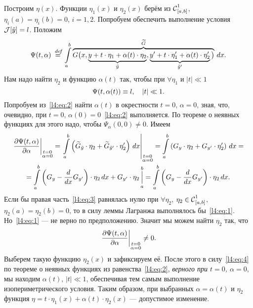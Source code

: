 Построим $\eta(x)$. Функции $\eta_1(x)$ и $\eta_2(x)$ берём из $\Cfn[{[a,b]}]{1}$, $\eta_i(a)=\eta_i(b)=0$, $i=1,2$. Попробуем обеспечить выполнение условия $\J[\tilde{y}]=l$. Положим
\begin{equation*}
	\hfill\Psi(t,\alpha)\eqdef\int\limits_a^b \overbrace{G\big(x,\underbrace{y+t\cdot\eta_1+\alpha(t)\cdot\eta_2}_{\tilde{y}},\underbrace{y'+t\cdot\eta'_1+\alpha(t)\cdot\eta'_2}_{\tilde{y}'}\big)}^{\widetilde{G}}\,dx.\hfill
\end{equation*}
Нам надо найти $\eta_2$ и функцию $\alpha(t)$ так, чтобы при $\forall\eta_1$ и $|t|\ll1$
\begin{equation}
	\label{l4:eq:2}
	\hfill\Psi(t,\alpha(t))\equiv l,\quad|t|\ll1.\hfill
\end{equation}
Попробуем из~\eqref{l4:eq:2} найти $\alpha(t)$ в окрестности $t=0$, $\alpha=0$, зная, что, очевидно, при $t=0$, ${\alpha(0)=0}$~\eqref{l4:eq:2} выполняется. По теореме о неявных функциях для этого надо, чтобы $\Psi_{\alpha}(0,0)\neq0$. Имеем
\begin{multline}
	\label{l4:eq:3}
	\left.\pder{\Psi(t,\alpha)}{\alpha}\right|_{\substack{t=0\\\alpha=0}}=\left.\int\limits_a^b\left(\widetilde{G}_{\tilde{y}}\cdot\eta_2+\widetilde{G}_{\tilde{y}'}\cdot\eta'_2\right)\,dx\right|_{\substack{t=0\\\alpha=0}}=\int\limits_a^b\left({G}_{{y}}\cdot\eta_2+{G}_{y'}\cdot\eta'_2\right)\,dx=\\
	=\int\limits_a^b\left(G_y-\der{}{x}G_{y'}\right)\cdot\eta_2\,dx+G_{y'}\cdot\eta_2\mathop{\Big|}\limits_a^b=\int\limits_a^b\left(G_y-\der{}{x}G_{y'}\right)\cdot\eta_2\,dx.
\end{multline}
Если бы правая часть~\eqref{l4:eq:3} равнялась нулю при $\forall\eta_2$, $\eta_2\in\Cfn[{[a,b]}]{1}$, $\eta_2(a)=\eta_2(b)=0$, то в силу леммы Лагранжа выполнялось бы~\eqref{l4:eq:1}. Но~\eqref{l4:eq:1} --- не верно по предположению. Значит мы можем найти $\eta_2$ так, что
\begin{equation}
	\label{l4:eq:4}
	\hfill\left.\pder{\Psi(t,\alpha)}{\alpha}\right|_{\substack{t=0\\\alpha=0}}\neq0.\hfill
\end{equation}
Выберем такую функцию $\eta_2(x)$ и зафиксируем её. После этого в силу~\eqref{l4:eq:4} по теореме о неявных функциях из равенства~\eqref{l4:eq:2}, \emph{верного при  $t=0$, $\alpha=0$}, мы находим $\alpha(t)$, $|t|\ll1$, обеспечивая тем самым выполнение изопериметрического условия. Таким образом, при выбранных $\alpha=\alpha(t)$ и $\eta_2$ функция $\eta=t\cdot\eta_1(x)+\alpha(t)\cdot\eta_2(x)$ --- допустимое изменение.

